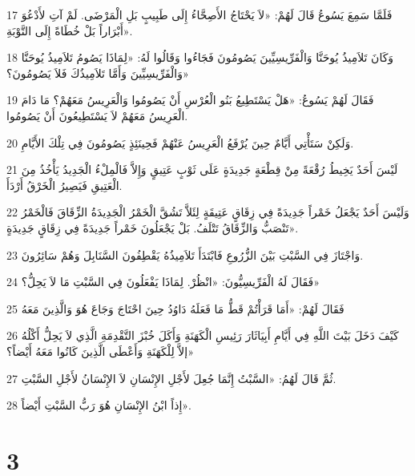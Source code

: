 \par 17 فَلَمَّا سَمِعَ يَسُوعُ قَالَ لَهُمْ: «لاَ يَحْتَاجُ الأَصِحَّاءُ إِلَى طَبِيبٍ بَلِ الْمَرْضَى. لَمْ آتِ لأَدْعُوَ أَبْرَاراً بَلْ خُطَاةً إِلَى التَّوْبَةِ».
\par 18 وَكَانَ تَلاَمِيذُ يُوحَنَّا وَالْفَرِّيسِيِّينَ يَصُومُونَ فَجَاءُوا وَقَالُوا لَهُ: «لِمَاذَا يَصُومُ تَلاَمِيذُ يُوحَنَّا وَالْفَرِّيسِيِّينَ وَأَمَّا تَلاَمِيذُكَ فَلاَ يَصُومُونَ؟»
\par 19 فَقَالَ لَهُمْ يَسُوعُ: «هَلْ يَسْتَطِيعُ بَنُو الْعُرْسِ أَنْ يَصُومُوا وَالْعَرِيسُ مَعَهُمْ؟ مَا دَامَ الْعَرِيسُ مَعَهُمْ لاَ يَسْتَطِيعُونَ أَنْ يَصُومُوا.
\par 20 وَلَكِنْ سَتَأْتِي أَيَّامٌ حِينَ يُرْفَعُ الْعَرِيسُ عَنْهُمْ فَحِينَئِذٍ يَصُومُونَ فِي تِلْكَ الأَيَّامِ.
\par 21 لَيْسَ أَحَدٌ يَخِيطُ رُقْعَةً مِنْ قِطْعَةٍ جَدِيدَةٍ عَلَى ثَوْبٍ عَتِيقٍ وَإِلاَّ فَالْمِلْءُ الْجَدِيدُ يَأْخُذُ مِنَ الْعَتِيقِ فَيَصِيرُ الْخَرْقُ أَرْدَأَ.
\par 22 وَلَيْسَ أَحَدٌ يَجْعَلُ خَمْراً جَدِيدَةً فِي زِقَاقٍ عَتِيقَةٍ لِئَلاَّ تَشُقَّ الْخَمْرُ الْجَدِيدَةُ الزِّقَاقَ فَالْخَمْرُ تَنْصَبُّ وَالزِّقَاقُ تَتْلَفُ. بَلْ يَجْعَلُونَ خَمْراً جَدِيدَةً فِي زِقَاقٍ جَدِيدَةٍ».
\par 23 وَاجْتَازَ فِي السَّبْتِ بَيْنَ الزُّرُوعِ فَابْتَدَأَ تَلاَمِيذُهُ يَقْطِفُونَ السَّنَابِلَ وَهُمْ سَائِرُونَ.
\par 24 فَقَالَ لَهُ الْفَرِّيسِيُّونَ: «انْظُرْ. لِمَاذَا يَفْعَلُونَ فِي السَّبْتِ مَا لاَ يَحِلُّ؟»
\par 25 فَقَالَ لَهُمْ: «أَمَا قَرَأْتُمْ قَطُّ مَا فَعَلَهُ دَاوُدُ حِينَ احْتَاجَ وَجَاعَ هُوَ وَالَّذِينَ مَعَهُ
\par 26 كَيْفَ دَخَلَ بَيْتَ اللَّهِ فِي أَيَّامِ أَبِيَاثَارَ رَئِيسِ الْكَهَنَةِ وَأَكَلَ خُبْزَ التَّقْدِمَةِ الَّذِي لاَ يَحِلُّ أَكْلُهُ إلاَّ لِلْكَهَنَةِ وَأَعْطَى الَّذِينَ كَانُوا مَعَهُ أَيْضاً؟»
\par 27 ثُمَّ قَالَ لَهُمُ: «السَّبْتُ إِنَّمَا جُعِلَ لأَجْلِ الإِنْسَانِ لاَ الإِنْسَانُ لأَجْلِ السَّبْتِ.
\par 28 إِذاً ابْنُ الإِنْسَانِ هُوَ رَبُّ السَّبْتِ أَيْضاً».

\chapter{3}

